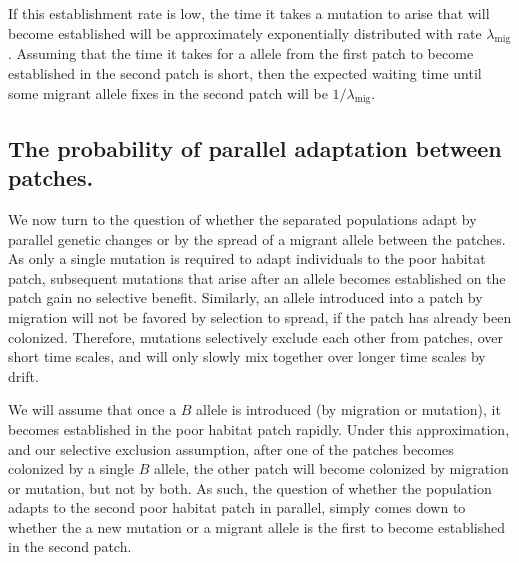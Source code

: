 \documentclass{article}
\newcommand{\migrate}{\lambda_\text{mig}}
\begin{document}
If this establishment rate is low, the time it takes
a mutation to arise that will become established 
will be approximately exponentially distributed with rate $\migrate$.
Assuming that the time it takes for a allele from the first patch to
become established in the second patch is short,
then  the expected waiting time until some migrant allele fixes in the
second patch will be $1/\migrate$.


\subsection{The probability of parallel adaptation between patches.} 
\label{ss:probparallel}

We now turn to the question of whether the separated populations adapt by parallel genetic changes 
or by the spread of a migrant allele between the patches. 
As only a single mutation is required to adapt individuals to the
poor habitat patch, subsequent mutations that arise after an allele becomes established on the patch gain no selective benefit. 
Similarly, an allele introduced into a patch by migration will not be favored by selection to spread, 
if the patch has already been colonized. 
Therefore, mutations selectively exclude each other from patches, over short time scales, 
and will only slowly mix together over longer time scales by drift. 

We will assume that once a $B$ allele is introduced (by migration or mutation), 
it becomes established in the poor habitat patch rapidly. 
Under this approximation, and our selective exclusion assumption, 
after one of the patches becomes colonized by a single $B$ allele, 
the other patch will become colonized by migration or mutation, but not by both. 
As such, the question of whether the
population adapts to the second poor habitat patch in parallel, 
simply comes down to whether the a new mutation or a migrant allele is the first to become established in the second patch. 
\end{document}
